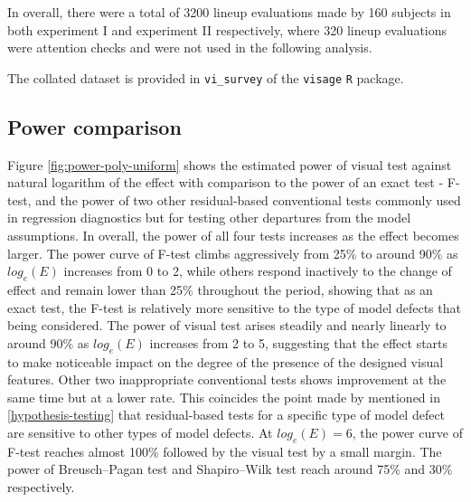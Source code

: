 \documentclass[]{interact}
\theoremstyle{plain}%
\theoremstyle{definition}
\theoremstyle{remark}
\begin{document}
In overall, there were a total of 3200 lineup evaluations made by 160
subjects in both experiment I and experiment II respectively, where 320
lineup evaluations were attention checks and were not used in the
following analysis.

The collated dataset is provided in \texttt{vi\_survey} of the
\texttt{visage} \texttt{R} package.

\hypertarget{power-comparison}{%
\subsection{Power comparison}\label{power-comparison}}

Figure \ref{fig:power-poly-uniform} shows the estimated power of visual
test against natural logarithm of the effect with comparison to the
power of an exact test - F-test, and the power of two other
residual-based conventional tests commonly used in regression
diagnostics but for testing other departures from the model assumptions.
In overall, the power of all four tests increases as the effect becomes
larger. The power curve of F-test climbs aggressively from 25\% to
around 90\% as \(log_e(E)\) increases from 0 to 2, while others respond
inactively to the change of effect and remain lower than 25\% throughout
the period, showing that as an exact test, the F-test is relatively more
sensitive to the type of model defects that being considered. The power
of visual test arises steadily and nearly linearly to around 90\% as
\(log_e(E)\) increases from 2 to 5, suggesting that the effect starts to
make noticeable impact on the degree of the presence of the designed
visual features. Other two inappropriate conventional tests shows
improvement at the same time but at a lower rate. This coincides the
point made by \citet{cook1982residuals} mentioned in
\ref{hypothesis-testing} that residual-based tests for a specific type
of model defect are sensitive to other types of model defects. At
\(log_e(E) = 6\), the power curve of F-test reaches almost 100\%
followed by the visual test by a small margin. The power of
Breusch--Pagan test and Shapiro--Wilk test reach around 75\% and 30\%
respectively.
\end{document}
